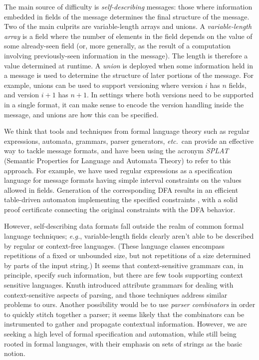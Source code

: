 \documentclass[a4paper,UKenglish,cleveref, autoref, thm-restate]{lipics-v2021}
\newcommand{\eg}{\textit{e.g.}}
\newcommand{\etc}{\textit{etc.}}
\begin{document}
The main source of difficulty is \emph{self-describing} messages:
those where information embedded in fields of the message determines
the final structure of the message. Two of the main culprits are
variable-length arrays and unions. A \emph{variable-length array} is a
field where the number of elements in the field depends on the value
of some already-seen field (or, more generally, as the result of a
computation involving previously-seen information in the message).
The length is therefore a value determined at runtime. A \emph{union}
is deployed when some information held in a message is used to
determine the structure of later portions of the message. For example,
unions can be used to support versioning where version $i$ has $n$
fields, and version $i+1$ has $n+1$. In settings where both versions
need to be supported in a single format, it can make sense to encode
the version handling inside the message, and unions are how this can
be specified.

We think that tools and techniques from formal language theory such as
regular expressions, automata, grammars, parser generators, \etc\, can
provide an effective way to tackle message formats, and have been
using the acronym \emph{SPLAT} (Semantic Properties for Language and
Automata Theory) to refer to this approach. For example, we have used
regular expressions as a specification language for message formats
having simple interval constraints on the values allowed in
fields. Generation of the corresponding DFA results in an efficient
table-driven automaton implementing the specified constraints
\cite{hardin-slind-safecomp-2016}, with a solid proof certificate
connecting the original constraints with the DFA behavior.

However, self-describing data formats fall outside the realm of common
formal language techniques; \eg, variable-length fields clearly aren't
able to be described by regular or context-free languages. (These
language classes encompass repetitions of a fixed or unbounded size,
but not repetitions of a size determined by parts of the input
string.) It seems that context-sensitive grammars can, in principle,
specify such information, but there are few tools supporting context
sensitive languages. Knuth introduced attribute grammars
\cite{knuth-attribute-grammars} for dealing with context-sensitive
aspects of parsing, and those techniques address similar problems to
ours. Another possibility would be to use \emph{parser combinators} in
order to quickly stitch together a parser; it seems likely that the
combinators can be instrumented to gather and propagate contextual
information. However, we are seeking a high level of formal
specification and automation, while still being rooted in formal
languages, with their emphasis on sets of strings as the basic notion.
\end{document}
